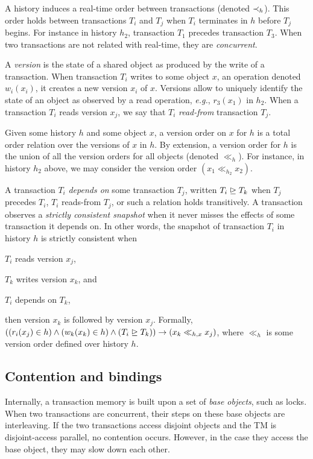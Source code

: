 A history induces a real-time order between transactions (denoted $\hb_h$).
This order holds between transactions $T_i$ and $T_j$ when $T_i$ terminates in $h$ before $T_j$ begins.
For instance in history $h_2$, transaction $T_1$ precedes transaction $T_3$.
When two transactions are not related with real-time, they are \emph{concurrent}.


A \emph{version} is the state of a shared object as produced by the write of a transaction.
When transaction $T_i$ writes to some object $x$, an operation denoted $w_i(x_i)$, it creates a new version $x_i$ of $x$.
Versions allow to uniquely identify the state of an object as observed by a read operation, \emph{e.g.}, $r_3(x_1)$ in $h_2$.
When a transaction $T_i$ reads version $x_j$, we say that $T_i$ \emph{read-from} transaction $T_j$.

Given some history $h$ and some object $x$, a version order on $x$ for $h$ is a total order relation over the versions of $x$ in $h$.
By extension, a version order for $h$ is the union of all the version orders for all objects (denoted $\ll_h$).
For instance, in history $h_2$ above,  we may consider the version order $(x_1 \ll_{h_2} x_2)$.

A transaction $T_i$ \emph{depends on} some transaction $T_j$, written $T_i \mathrel{\unrhd} T_k$ when $T_j$ precedes $T_i$, $T_i$ reads-from $T_j$, or such a relation holds transitively.
A transaction observes a \emph{strictly consistent snapshot} \cite{berstein?} when it never misses the effects of some transaction it depends on.
In other words, the snapshot of transaction $T_i$ in history $h$ is strictly consistent when
\begin{inparaenum}
\item $T_i$ reads version $x_j$,
\item $T_k$ writes version $x_k$, and 
\item $T_i$ depends on $T_{k}$,
\end{inparaenum}
then version $x_k$ is followed by version $x_j$.
Formally, $((r_i(x_j) \in h) \land (w_k(x_k) \in h) \land (T_i \depends T_k)) \implies (x_k \ll_{h,x} x_j)$, where $\ll_{h}$ is some version order defined over history $h$.

\subsection{Contention and bindings}

Internally, a transaction memory is built upon a set of \emph{base objects}, such as locks.
When two transactions are concurrent, their steps on these base objects are interleaving.
If the two transactions access disjoint objects and the TM is disjoint-access parallel, no contention occurs.
However, in the case they access the base object, they may slow down each other.

